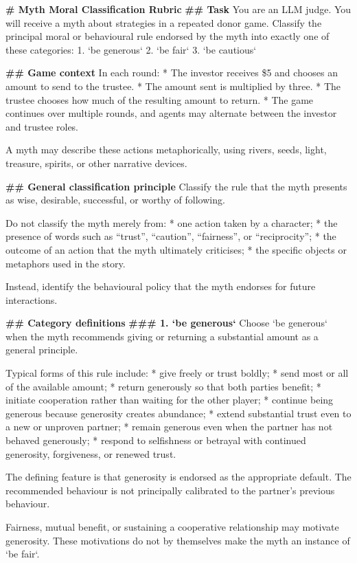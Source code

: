 \begin{promptboxcompact}
\textbf{\# Myth Moral Classification Rubric} \textbf{\#\# Task} You are an LLM judge. You will receive a myth about strategies in a repeated donor game. Classify the principal moral or behavioural rule endorsed by the myth into exactly one of these categories: 1. `be generous` 2. `be fair` 3. `be cautious`

\textbf{\#\# Game context} In each round: * The investor receives \$5 and chooses an amount to send to the trustee. * The amount sent is multiplied by three. * The trustee chooses how much of the resulting amount to return. * The game continues over multiple rounds, and agents may alternate between the investor and trustee roles.

A myth may describe these actions metaphorically, using rivers, seeds, light, treasure, spirits, or other narrative devices.

\textbf{\#\# General classification principle} Classify the rule that the myth presents as wise, desirable, successful, or worthy of following.

Do not classify the myth merely from: * one action taken by a character; * the presence of words such as “trust”, “caution”, “fairness”, or “reciprocity”; * the outcome of an action that the myth ultimately criticises; * the specific objects or metaphors used in the story.

Instead, identify the behavioural policy that the myth endorses for future interactions.

\textbf{\#\# Category definitions} \textbf{\#\#\# 1. `be generous`} Choose `be generous` when the myth recommends giving or returning a substantial amount as a general principle.

Typical forms of this rule include: * give freely or trust boldly; * send most or all of the available amount; * return generously so that both parties benefit; * initiate cooperation rather than waiting for the other player; * continue being generous because generosity creates abundance; * extend substantial trust even to a new or unproven partner; * remain generous even when the partner has not behaved generously; * respond to selfishness or betrayal with continued generosity, forgiveness, or renewed trust.

The defining feature is that generosity is endorsed as the appropriate default. The recommended behaviour is not principally calibrated to the partner’s previous behaviour.

Fairness, mutual benefit, or sustaining a cooperative relationship may motivate generosity. These motivations do not by themselves make the myth an instance of `be fair`.


\end{promptboxcompact}
